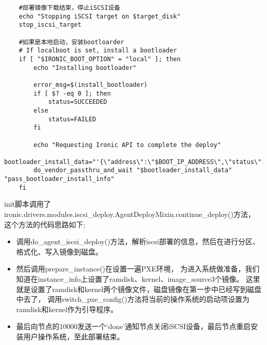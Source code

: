 \documentclass[a4paper,left=2.5cm,right=2.5cm,11pt]{article}
\begin{document}
\begin{lstlisting}
	#部署镜像下载结束，停止iSCSI设备
	echo "Stopping iSCSI target on $target_disk"
	stop_iscsi_target

	#如果是本地启动，安装bootloarder
	# If localboot is set, install a bootloader
	if [ "$IRONIC_BOOT_OPTION" = "local" ]; then
		echo "Installing bootloader"

		error_msg=$(install_bootloader)
		if [ $? -eq 0 ]; then
			status=SUCCEEDED
		else
			status=FAILED
		fi

		echo "Requesting Ironic API to complete the deploy"
	bootloader_install_data="'{\"address\":\"$BOOT_IP_ADDRESS\",\"status\":\"$status\",\"key\":\"$DEPLOYMENT_KEY\",\"error\":\"$error_msg\"}'"
		do_vendor_passthru_and_wait "$bootloader_install_data" "pass_bootloader_install_info"
	fi
	\end{lstlisting}

	init脚本调用了ironic.drivers.modules.iscsi\_deploy.AgentDeployMixin.continue\_deploy()方法，
	这个方法的代码思路如下;
	\begin{itemize}
		\item[1.] 调用do\_agent\_iscsi\_deploy()方法，解析iscsi部署的信息，然后在进行分区、格式化、写入镜像到磁盘。
		\item[2.] 然后调用prepare\_instance()在设置一遍PXE环境，
		为进入系统做准备，我们知道在instance\_info上设置了ramdisk、kernel、image\_source3个镜像。
		这里就是设置了ramdisk和kernel两个镜像文件，磁盘镜像在第一步中已经写到磁盘中去了，
		调用switch\_pxe\_config()方法将当前的操作系统的启动项设置为ramdisk和kernel作为引导程序。 

		\item[3.]  最后向节点的10000发送一个‘done’通知节点关闭iSCSI设备，最后节点重启安装用户操作系统，至此部署结束。
	\end{itemize}
\end{document}
